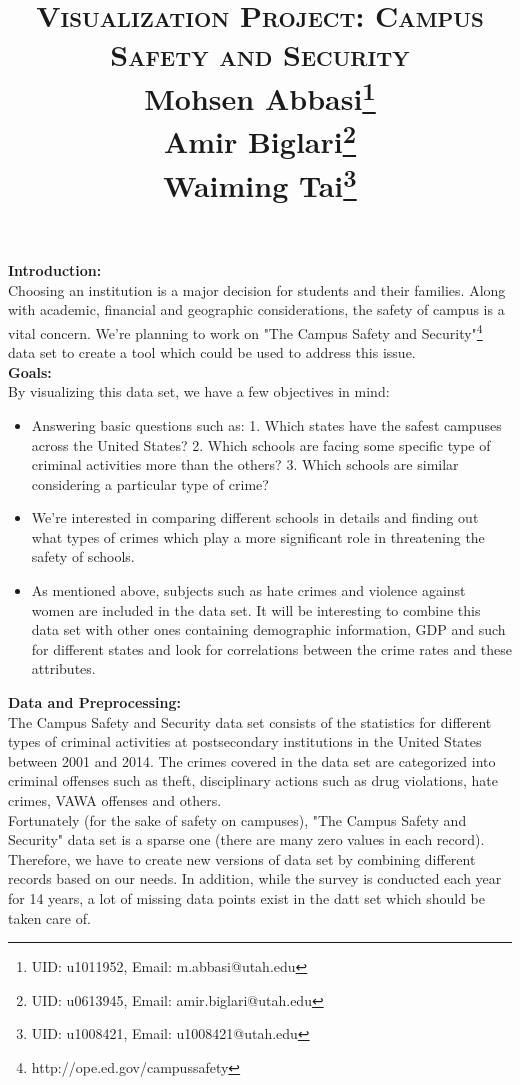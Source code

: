 \documentclass[12pt]{article}
\title{	
\normalfont \Large 
\textsc{Visualization Project: Campus Safety and Security} \\ [10pt] %
Mohsen Abbasi\footnote{UID: u1011952, Email: m.abbasi@utah.edu} \\ %
Amir Biglari\footnote{UID: u0613945, Email: amir.biglari@utah.edu}\\
Waiming Tai\footnote{UID: u1008421, Email: u1008421@utah.edu}
}
\begin{document}
\maketitle
\noindent
\textbf{Introduction:}\\
Choosing an institution is a major decision for students and their families. Along with academic, financial and 
geographic considerations, the safety of campus is a vital concern. We're planning to work on "The Campus Safety and Security"\footnote{http://ope.ed.gov/campussafety} data set to create a tool which could be used to address this issue.\\ 

\noindent
\textbf{Goals:}\\
By visualizing this data set, we have a few objectives in mind:
\begin{itemize}
\item Answering basic questions such as: 1. Which states have the safest campuses across the United States? 2. Which schools are facing some specific type of criminal activities more than the others? 3. Which schools are similar considering a particular type of crime?   
\item We're interested in comparing different schools in details and finding out what types of crimes which play a more significant role in threatening the safety of schools.
\item As mentioned above, subjects such as hate crimes and violence against women are included in the data set. It will be interesting to combine this data set with other ones containing demographic information, GDP and such for different states and look for correlations between the crime rates and these attributes. 
\end{itemize}

\noindent
\textbf{Data and Preprocessing:}\\
The Campus Safety and Security data set consists of the statistics for different types of criminal activities at postsecondary institutions in the United States between 2001 and 2014. The crimes covered in the data set are categorized into criminal offenses such as theft, disciplinary actions such as drug violations, hate crimes, VAWA offenses and others.\\
Fortunately (for the sake of safety on campuses), "The Campus Safety and Security" data set is a sparse one (there are many zero values in each record). Therefore, we have to create new versions of data set by combining different records based on our needs. In addition, while the survey is conducted each year for 14 years, a lot of missing data points exist in the datt set which should be taken care of.\\
\end{document}
